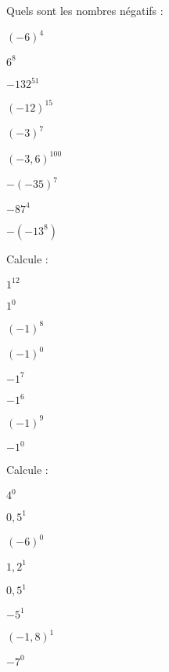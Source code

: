 \begin{exercice}[]
Quels sont les nombres négatifs :

\begin{colenumerate}{3} 
\item $(-6)^4$
\item $6^8$
\item $-132^{51}$
\item $(-12)^{15}$
\item $(-3)^7$
\item $(-3,6)^{100}$
\item $-(-35)^7$
\item $-87^4$
\item $-(-13^8)$
\end{colenumerate} 
 
\end{exercice}


\begin{exercice}[Puissance de 1 ou de $-1$]

Calcule :

\begin{colenumerate}{4} 
\item $1^{12}$
\item $1^0$
\item $(-1)^8$
\item $(-1)^0$
\item $-1^7$
\item $-1^6$
\item $(-1)^9$
\item $-1^0$
\end{colenumerate} 
 
\end{exercice}

\begin{exercice}[Exposant 0 ou 1]

Calcule :

\begin{colenumerate}{4} 
\item $4^0$
\item $0,5^1$
\item $(-6)^0$
\item $1,2^1$
\item $0,5^1$
\item $-5^1$
\item $(-1,8)^1$
\item $-7^0$
\end{colenumerate} 
 
\end{exercice}

